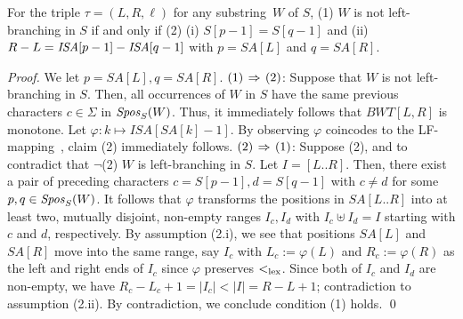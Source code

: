 

\begin{lemma}\label{lem:leftmaximal:character}
For the triple $\tau = (L,R, \ell)$ for any substring~$W$ of $S$, 
(1) $W$ is not left-branching in $S$ if and only if  
(2) (i) $S[p-1] = S[q-1]$ and (ii) $R - L = \mathit{ISA}[p-1] - \mathit{ISA}[q-1]$ with $p = SA[L]$ and $q = SA[R]$.
\end{lemma}

\begin{proof}
We let $p = SA[L], q = SA[R]$. 
$(1)\mathbin{\,\Rightarrow\,} (2)$: Suppose that $W$ is not left-branching in $S$.
Then, all occurrences of $W$ in $S$ have the same previous characters $c \in \Sigma$ in $\mathit{Spos}_{S}(W)$. Thus, it immediately follows that $BWT[L, R]$ is monotone.
Let $\varphi: k \mapsto ISA[SA[k]-1]$. By observing $\varphi$ coincodes to the LF-mapping~\cite{Ferragina05:FM}, claim (2) immediately follows. 
$(2) \mathbin{\,\Rightarrow\,} (1)$: 
Suppose (2), and to contradict that $\neg$(2) $W$ is left-branching in $S$. Let $I = [L..R]$. Then, there exist a pair of preceding characters $c = S[p-1], d=S[q-1]$ with $c\not= d$ for some $p, q \in \mathit{Spos}_{S}(W)$. It follows that $\varphi$ transforms the positions in  $SA[L..R]$ into at least two, mutually disjoint, non-empty ranges $I_c, I_d$ with $I_c\uplus I_d = I$ starting with $c$ and $d$, respectively. By assumption (2.i), we see that positions $SA[L]$ and $SA[R]$ move into the same range, say $I_c$ with $L_c := \varphi(L)$ and $R_c := \varphi(R)$ as the left and right ends of $I_c$ since $\varphi$ preserves $<_{\mathrm{lex}}$. 
Since both of $I_c$ and $I_d$ are non-empty, we have $R_c - L_c + 1 = |I_c| < |I| = R - L + 1$; contradiction to assumption (2.ii). By contradiction, we conclude condition (1) holds. 
\qed   
\end{proof}

